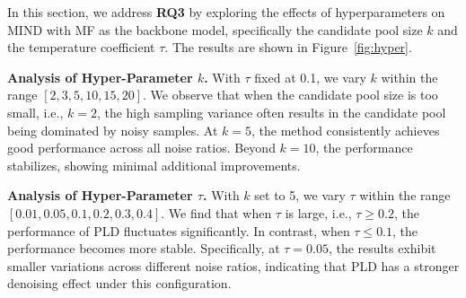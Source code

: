 

In this section, we address \textbf{RQ3} by exploring the effects of hyperparameters on MIND with MF as the backbone model, specifically the candidate pool size $k$ and the temperature coefficient $\tau$. The results are shown in Figure~\ref{fig:hyper}.

\textbf{Analysis of Hyper-Parameter $k$.} With $\tau$ fixed at 0.1, we vary $k$ within the range $[2, 3, 5, 10, 15, 20]$. We observe that when the candidate pool size is too small, i.e., $k = 2$, the high sampling variance often results in the candidate pool being dominated by noisy samples. At $k = 5$, the method consistently achieves good performance across all noise ratios. Beyond $k = 10$, the performance stabilizes, showing minimal additional improvements.

\textbf{Analysis of Hyper-Parameter $\tau$.} With $k$ set to 5, we vary $\tau$ within the range $[0.01, 0.05, 0.1, 0.2, 0.3, 0.4]$. We find that when $\tau$ is large, i.e., $\tau \geq 0.2$, the performance of PLD fluctuates significantly. In contrast, when $\tau \leq 0.1$, the performance becomes more stable. Specifically, at $\tau = 0.05$, the results exhibit smaller variations across different noise ratios, indicating that PLD has a stronger denoising effect under this configuration.

